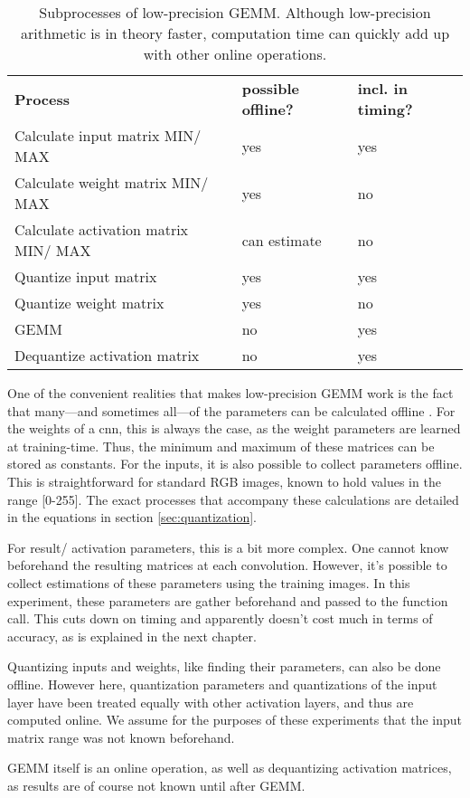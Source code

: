 \begin{table}[]
\centering
\caption[Low-precision GEMM broken down by process]{Subprocesses of low-precision GEMM. Although low-precision arithmetic is in theory faster, computation time can quickly add up with other online operations.}
\label{tbl:gemmlowp}
\begin{tabular}{lll}
\textbf{Process}                                       & \textbf{possible offline?} & \textbf{incl. in timing?} \\
Calculate input matrix MIN/ MAX     & yes                        & yes                       \\
Calculate weight matrix MIN/ MAX     & yes                        & no                        \\
Calculate activation matrix MIN/ MAX & can estimate               & no                        \\
Quantize input matrix                & yes                        & yes                       \\
Quantize weight matrix               & yes                        & no                        \\
GEMM                                 & no                         & yes                       \\
Dequantize activation matrix         & no                         & yes                      
\end{tabular}
\end{table}

One of the convenient realities that makes low-precision GEMM work is the fact that many---and sometimes all---of the parameters can be calculated offline \cite{warden_quantize}. For the weights of a cnn, this is always the case, as the weight parameters are learned at training-time. Thus, the minimum and maximum of these matrices can be stored as constants. For the inputs, it is also possible to collect parameters offline. This is straightforward for standard RGB images, known to hold values in the range [0-255]. The exact processes that accompany these calculations are detailed in the equations in section \ref{sec:quantization}.

For result/ activation parameters, this is a bit more complex. One cannot know beforehand the resulting matrices at each convolution. However, it's possible to collect estimations of these parameters using the training images. In this experiment, these parameters are gather beforehand and passed to the function call. This cuts down on timing and apparently doesn't cost much in terms of accuracy, as is explained in the next chapter.

Quantizing inputs and weights, like finding their parameters, can also be done offline. However here, quantization parameters and quantizations of the input layer have been treated equally with other activation layers, and thus are computed online. We assume for the purposes of these experiments that the input matrix range was not known beforehand.

GEMM itself is an online operation, as well as dequantizing activation matrices, as results are of course not known until after GEMM.